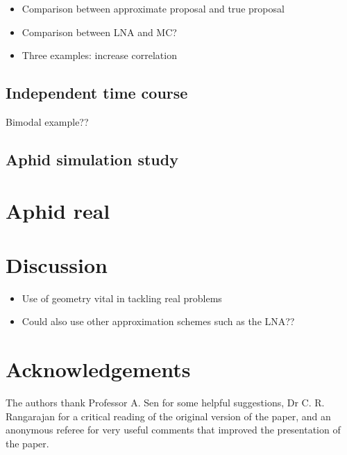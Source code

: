 \documentclass[useAMS,usenatbib,referee]{example/biom}
\begin{document}
\begin{itemize}
\item Comparison between approximate proposal and true proposal
\item Comparison between LNA and MC?
\item Three examples: increase correlation
\end{itemize}

\subsection{Independent time course}

Bimodal example??

\subsection{Aphid simulation study}

\section{Aphid real}


\section{Discussion}

\begin{itemize}
\item Use of geometry vital in tackling real problems
\item Could also use other approximation schemes such as the LNA??
\end{itemize}

\backmatter


\section*{Acknowledgements}

The authors thank Professor A. Sen for some helpful suggestions,
Dr C. R. Rangarajan for a critical reading of the original version of the
paper, and an anonymous referee for very useful comments that improved
the presentation of the paper.\vspace*{-8pt}

\end{document}
